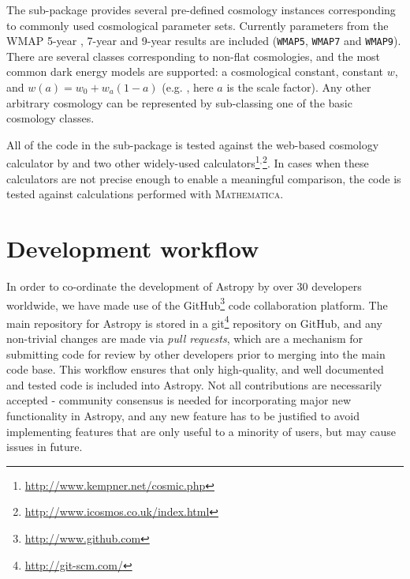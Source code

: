 \documentclass[traditabstract]{aa}
\begin{document}
The sub-package provides several pre-defined cosmology instances
corresponding to commonly used cosmological parameter sets. Currently
parameters from the WMAP 5-year \citep{Komatsu09}, 7-year
\citep{Komatsu11} and 9-year results \citep{Hinshaw13} are included
(\texttt{WMAP5}, \texttt{WMAP7} and \texttt{WMAP9}). There are several
classes corresponding to non-flat cosmologies, and the most common
dark energy models are supported: a cosmological constant, constant
$w$, and $w(a) = w_0 + w_a (1-a)$ (e.g. \citealt{Linder03}, here $a$
is the scale factor). Any other arbitrary cosmology can be represented
by sub-classing one of the basic cosmology classes.

All of the code in the sub-package is tested against the web-based
cosmology calculator by \citet{Wright06} and two other widely-used
calculators\footnote{\url{http://www.kempner.net/cosmic.php}}$^,$\footnote{\url{http://www.icosmos.co.uk/index.html}}.
In cases when these calculators are not precise enough to enable a
meaningful comparison, the code is tested against calculations
performed with \textsc{Mathematica}.

\section{Development workflow}

\label{sec:workflow}



In order to co-ordinate the development of Astropy by over 30 developers
worldwide, we have made use of the
GitHub\footnote{\url{http://www.github.com}} code collaboration platform. The
main repository for Astropy is stored in a
git\footnote{\url{http://git-scm.com/}} repository on GitHub, and any
non-trivial changes are made via \textit{pull requests}, which are a mechanism
for submitting code for review by other developers prior to merging into the
main code base. This workflow ensures that only high-quality, and well
documented and tested code is included into Astropy. Not all contributions are
necessarily accepted - community consensus is needed for incorporating major
new functionality in Astropy, and any new feature has to be justified to avoid
implementing features that are only useful to a minority of users, but may
cause issues in future.
\end{document}
